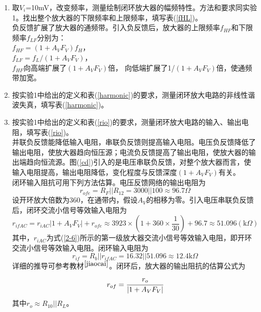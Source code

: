 \documentclass[a4paper]{article}
\begin{document}
\begin{enumerate}
\begin{enumerate}
\item 取$V_i$=10mV，改变频率，测量绘制闭环放大器的幅频特性。方法和要求同实验1。找出整个放大器的下限频率和上限频率，填写表(\ref{fHL})。\\
负反馈扩展了放大器的通频带。引入负反馈后，放大器的上限频率$f_{HF}$和下限频率$f_{LF}$分别为：\\
$f_{HF} = (1+A_VF_V)f_H$，\\
$f_{LF} = f_L/(1+A_VF_V)$，\\
$f_{HF}$向高端扩展了$(1+A_VF_V)$倍， 向低端扩展了1/$(1+A_VF_V)$倍，使通频带加宽。
\item 按实验1中给出的定义和表(\ref{harmonic})的要求，测量闭环放大电路的非线性谐波失真，填写表(\ref{harmonic})。
\item 按实验1中给出的定义和表(\ref{rio})的要求，测量闭环放大电路的输入、输出电阻，填写表(\ref{rio})。\\
并联负反馈能降低输入电阻，串联负反馈则提高输入电阻。电压负反馈降低了输出电阻，使放大器趋向恒压源；电流负反馈提高了输出电阻，使放大器的输出端趋向恒流源。图(\ref{cd})引入的是电压串联负反馈，对整个放大器而言，使输入电阻提高，输出电阻降低，变化程度与反馈深度$(1+A_VF_V)$有关。\\
闭环输入阻抗可用下列方法估算。电压反馈网络的输出电阻为
\begin{equation}
r_{ofe} = R_F||R_{12} = 3000||100 \approx 96.7\Omega
\end{equation}
设开环放大倍数为360，在通带内，假设$A_V$的相移为零。引入电压串联负反馈后，闭环交流小信号等效输入电阻为
\begin{equation}
r_{ifAC} = r_{iAC}|1+A_VF_V|+r_{ofe}
 \approx 3923\times (1+360\times\frac{1}{30})+96.7
  \approx 51.096(\text{k}\Omega)
\end{equation}
其中，$r_{iAC}$为式(\ref{2-6})所示的第一级放大器交流小信号等效输入电阻，即开环交流小信号等效输入电阻。闭环输入电阻为
\begin{equation}
r_{if} = R_b||r_{ifAC} = 16.32||51.096 \approx 12.4\text{k}\Omega
\end{equation}
详细的推导可参考教材$^{\cite{jiaocai}}$。闭环后，放大器的输出阻抗的估算公式为
\begin{equation}
r_{of} = \cfrac{r_o}{|1+A_VF_V|}
\end{equation}
其中$r_o \approx R_{10}||R_L$。
\end{enumerate}
\end{enumerate}
\end{document}
